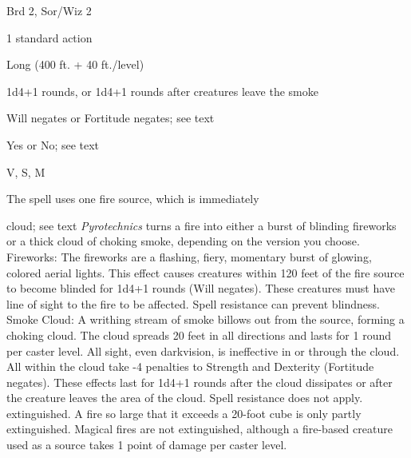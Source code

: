 
\begin{description*}
\item[Level:] Brd 2, Sor/Wiz 2
\item[Casting Time:] 1 standard action
\item[Range:] Long (400 ft. + 40 ft./level)
\item[Duration:] 1d4+1 rounds, or 1d4+1 rounds after creatures leave the smoke
\item[Saving Throw:] Will negates or Fortitude negates; see text
\item[Spell Resistance:] Yes or No; see text
\item[Components:] V, S, M
\item[Arcane Material Component:] The spell uses one fire source, which is immediately
\end{description*}

cloud; see text
\textit{Pyrotechnics} turns a fire into either a burst of blinding fireworks or
a thick cloud of choking smoke, depending on the version you choose.
Fireworks: The fireworks are a flashing, fiery, momentary burst of glowing,
colored aerial lights. This effect causes creatures within 120 feet of the fire
source to become blinded for 1d4+1 rounds (Will negates). These creatures must
have line of sight to the fire to be affected. Spell resistance can prevent blindness.
Smoke Cloud: A writhing stream of smoke billows out from the source, forming
a choking cloud. The cloud spreads 20 feet in all directions and lasts for 1 round
per caster level. All sight, even darkvision, is ineffective in or through the
cloud. All within the cloud take -4 penalties to Strength and Dexterity (Fortitude
negates). These effects last for 1d4+1 rounds after the cloud dissipates or after
the creature leaves the area of the cloud. Spell resistance does not apply.
extinguished. A fire so large that it exceeds a 20-foot cube is only partly extinguished.
Magical fires are not extinguished, although a fire-based creature used as a source
takes 1 point of damage per caster level.